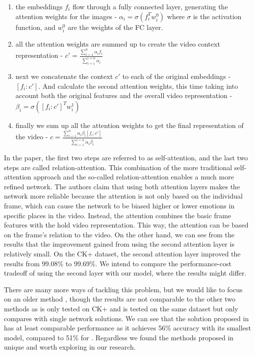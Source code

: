 \documentclass[../main.tex]{subfiles}
\begin{document}
\begin{samepage}
\begin{enumerate}[i]
    \item the embeddings $f_i$ flow through a fully connected layer, generating the attention weights for the images - $\alpha_i = \sigma(f_i^Tw_i^0)$
        where $\sigma$ is the activation function, and $w_i^0$ are the weights of the FC layer.
    \item all the attention weights are summed up to create the video context representation - $c'=\frac{\sum_{i=1}^{n}\alpha_if_i}{\sum_{i=1}^{i=n}\alpha_i}$
    \item next we concatenate the context $c'$ to each of the original embeddings - $[f_i:c']$. And calculate the second attention weights, this time 
        taking into account both the original features and the overall video representation - $\beta_i = \sigma([f_i:c']^Tw_i^1)$
    \item finally we sum up all the attention weights to get the final representation of the video - 
    $c = \frac{\sum_{i=1}^{n}\alpha_i\beta_i[f_i:c']}{\sum_{i=1}^{i=n}\alpha_i\beta_i}$
\end{enumerate}
\end{samepage}

In the paper, the first two steps are referred to as self-attention, and the last two steps are called relation-attention.
This combination of the more traditional self-attention approach and the so-called relation-attention enables a much more refined network.
The authors claim that using both attention layers makes the network more reliable because the attention is not only based on the individual frame,
which can cause the network to be biased higher or lower emotions in specific places in the video. Instead, the attention combines the basic frame
features with the hold video representation. This way, the attention can be based on the frame's relation to the video.
On the other hand, we can see from the results that the improvement gained from using the second attention layer is relatively small. On the CK+ dataset,
the second attention layer improved the results from 99.08\% to 99.69\%. We intend to compare the performance-cost tradeoff of
using the second layer with our model, where the results might differ.
\par

There are many more ways of tackling this problem, but we would like to focus on an older method \cite{c3d},
though the results are not comparable to the other two methods as \cite{emotionnet-nano} is only tested on CK+ and \cite{fan}
is tested on the same dataset but only compares with single network solutions. We can see that the solution proposed in \cite{c3d}
has at least comparable performance as it achieves 56\% accuracy with its smallest model, compared to 51\% for \cite{fan}.
Regardless we found the methods proposed in \cite{c3d} unique and worth exploring in our research.
\par
\end{document}
